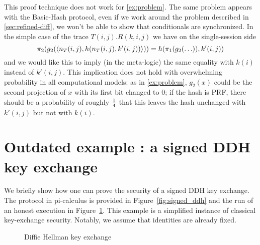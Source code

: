 \begin{example} \label{ex:indep}
  This proof technique does not work for \cref{ex:problem}.
  The same problem appears with the Basic-Hash protocol, even if we work around
  the problem described in \cref{sec:refined-diff}, we won't be able to show
  that conditionals are synchronized.  In the simple case of the trace
  $T(i,j).R(k,i,j)$ we have
  on the single-session side
  $$\pi_2(g_2(\langle n_T(i,j),h(n_T(i,j),k'(i,j)) \rangle)) =
  h(\pi_1(g_2(\ldots)),k'(i,j))$$
  and we would like this to imply (in the meta-logic)
  the same equality with $k(i)$ instead of $k'(i,j)$.
  This implication does not hold with overwhelming probability in all
  computational models: as in \cref{ex:problem}, $g_2(x)$ could be the second
  projection of $x$ with its first bit changed to $0$; if the hash is PRF,
  there should be a probability of roughly $1 \over 4$ that this leaves
  the hash unchanged with $k'(i,j)$ but not with $k(i)$.
\end{example}

\section{Outdated example : a signed DDH key exchange}

We briefly show how one can prove the security of a signed DDH key exchange. The protocol in pi-calculus is provided in Figure~\ref{fig:signed_ddh} and the run of an honest execution in Figure~\ref{fig:dh_ke}. This example is a simplified instance of classical key-exchange security. Notably, we assume that identities are already fixed.

\begin{figure}
  \setmsckeyword{} 
  \begin{center}
    \begin{msc}{}
      \setlength{\instwidth}{0\mscunit}
      \setlength{\instdist}{7cm}
      \setlength{\topheaddist}{0cm}


      \nextlevel[-1]
      \nextlevel[1.5]
      \nextlevel[1.5]




    \end{msc}
  \end{center}
  \caption{Diffie Hellman key exchange}\label{fig:dh_ke}
\end{figure}

